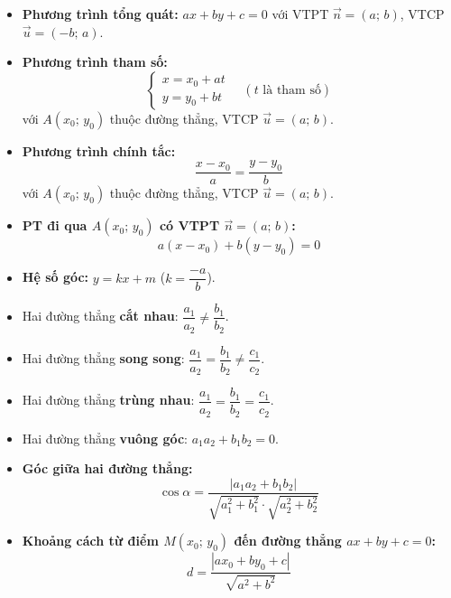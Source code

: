 \documentclass[12pt,a4paper]{article}
\begin{document}
\begin{congthuc}[title={Các dạng phương trình đường thẳng}]
  \begin{itemize}
    \item \textbf{Phương trình tổng quát:} $ax + by + c = 0$ với VTPT $\vec n = (a;\, b)$, VTCP $\vec u = (-b;\, a)$.
    \item \textbf{Phương trình tham số:}
      \[
        \begin{cases} x = x_0 + at \\ y = y_0 + bt \end{cases} \quad (t \text{ là tham số})
      \]
      với $A(x_0;\, y_0)$ thuộc đường thẳng, VTCP $\vec u = (a;\, b)$.
    \item \textbf{Phương trình chính tắc:}
      \[
        \dfrac{x - x_0}{a} = \dfrac{y - y_0}{b}
      \]
      với $A(x_0;\, y_0)$ thuộc đường thẳng, VTCP $\vec u = (a;\, b)$.
    \item \textbf{PT đi qua $A(x_0;\, y_0)$ có VTPT $\vec n = (a;\, b)$:}
      \[
        a(x - x_0) + b(y - y_0) = 0
      \]
    \item \textbf{Hệ số góc:} $y = kx + m$ \quad ($k = \dfrac{-a}{b}$).
  \end{itemize}
\end{congthuc}

\begin{tinhchat}[title={Vị trí tương đối giữa hai đường thẳng}]
  \begin{itemize}
    \item Hai đường thẳng \textbf{cắt nhau}: $\dfrac{a_1}{a_2} \ne \dfrac{b_1}{b_2}$.
    \item Hai đường thẳng \textbf{song song}: $\dfrac{a_1}{a_2} = \dfrac{b_1}{b_2} \ne \dfrac{c_1}{c_2}$.
    \item Hai đường thẳng \textbf{trùng nhau}: $\dfrac{a_1}{a_2} = \dfrac{b_1}{b_2} = \dfrac{c_1}{c_2}$.
    \item Hai đường thẳng \textbf{vuông góc}: $a_1 a_2 + b_1 b_2 = 0$.
  \end{itemize}
\end{tinhchat}

\begin{congthuc}[title={Góc và khoảng cách}]
  \begin{itemize}
    \item \textbf{Góc giữa hai đường thẳng:}
      \[
        \cos\alpha = \dfrac{|a_1 a_2 + b_1 b_2|}{\sqrt{a_1^2 + b_1^2} \cdot \sqrt{a_2^2 + b_2^2}}
      \]
    \item \textbf{Khoảng cách từ điểm $M(x_0;\, y_0)$ đến đường thẳng $ax + by + c = 0$:}
      \[
        d = \dfrac{|ax_0 + by_0 + c|}{\sqrt{a^2 + b^2}}
      \]
  \end{itemize}
\end{congthuc}
\end{document}
